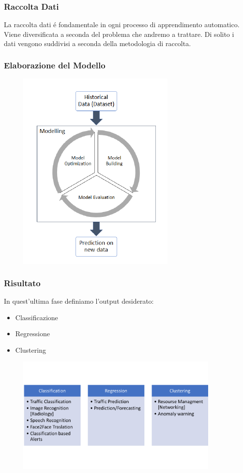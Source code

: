 \documentclass[xcolor=dvipsnames]{beamer}
\begin{document}
\begin{frame}
    \frametitle{Raccolta Dati}
    La raccolta dati é fondamentale in ogni processo di apprendimento automatico.
    Viene diversificata a seconda del problema che andremo a trattare.
    Di solito i dati vengono suddivisi a seconda della \alert{metodologia di raccolta}.
\end{frame}

\begin{frame}
    \frametitle{Elaborazione del Modello}
    \begin{figure}[htbp]
        \includegraphics{MLProcess.png}
    \end{figure}
\end{frame}

\begin{frame}
    \frametitle{Risultato}
    In quest'ultima fase definiamo l'output desiderato:
    \begin{itemize}
        \item Classificazione
        \item Regressione 
        \item Clustering
    \end{itemize}
    \begin{figure}
        \includegraphics[width=0.9\textwidth , height=0.7\textheight]{categoryML.png}
    \end{figure}
\end{frame}
\end{document}
